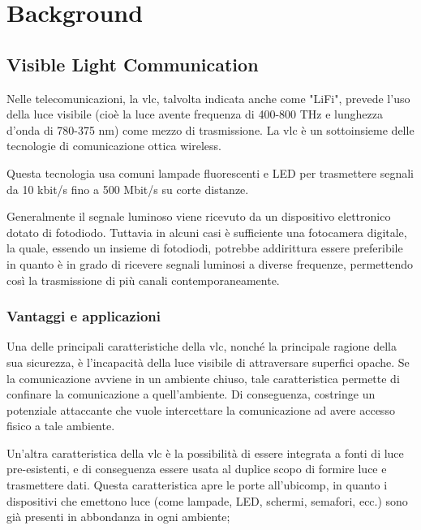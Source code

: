 \chapter{Background}
\label{cap:background}


\section{Visible Light Communication}
Nelle telecomunicazioni, la \gls{vlc}, talvolta indicata anche come "LiFi", prevede l'uso della luce visibile (cioè la luce avente frequenza di 400-800 THz e lunghezza d'onda di 780-375 nm) come mezzo di trasmissione. La \gls{vlc} è un sottoinsieme delle tecnologie di comunicazione ottica wireless.

Questa tecnologia usa comuni lampade fluorescenti e LED per trasmettere segnali da 10 kbit/s fino a 500 Mbit/s su corte distanze.

Generalmente il segnale luminoso viene ricevuto da un dispositivo elettronico dotato di fotodiodo. Tuttavia in alcuni casi è sufficiente una fotocamera digitale, la quale, essendo un insieme di fotodiodi, potrebbe addirittura essere preferibile in quanto è in grado di ricevere segnali luminosi a diverse frequenze, permettendo così la trasmissione di più canali contemporaneamente.

\subsection{Vantaggi e applicazioni}
Una delle principali caratteristiche della \gls{vlc}, nonché la principale ragione della sua sicurezza, è l'incapacità della luce visibile di attraversare superfici opache. Se la comunicazione avviene in un ambiente chiuso, tale caratteristica permette di confinare la comunicazione a quell'ambiente. Di conseguenza, costringe un potenziale attaccante che vuole intercettare la comunicazione ad avere accesso fisico a tale ambiente.

Un'altra caratteristica della \gls{vlc} è la possibilità di essere integrata a fonti di luce pre-esistenti, e di conseguenza essere usata al duplice scopo di formire luce e trasmettere dati. Questa caratteristica apre le porte all'\gls{ubicomp}\glsfirstoccur, in quanto i dispositivi che emettono luce (come lampade, LED, schermi, semafori, ecc.) sono già presenti in abbondanza in ogni ambiente;

